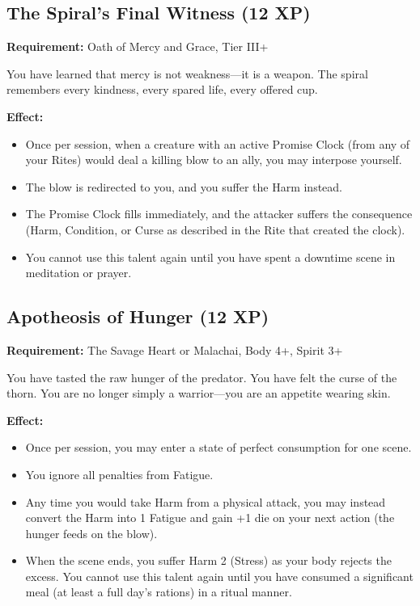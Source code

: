 \subsection{The Spiral's Final Witness (12 XP)}

\textbf{Requirement:} Oath of Mercy and Grace, Tier III+

You have learned that mercy is not weakness—it is a weapon. The spiral remembers every kindness, every spared life, every offered cup.

\textbf{Effect:}
\begin{itemize}
\item Once per session, when a creature with an active Promise Clock (from any of your Rites) would deal a killing blow to an ally, you may interpose yourself.
\item The blow is redirected to you, and you suffer the Harm instead.
\item The Promise Clock fills immediately, and the attacker suffers the consequence (Harm, Condition, or Curse as described in the Rite that created the clock).
\item You cannot use this talent again until you have spent a downtime scene in meditation or prayer.
\end{itemize}

\subsection{Apotheosis of Hunger (12 XP)}

\textbf{Requirement:} The Savage Heart or Malachai, Body 4+, Spirit 3+

You have tasted the raw hunger of the predator. You have felt the curse of the thorn. You are no longer simply a warrior—you are an appetite wearing skin.

\textbf{Effect:}
\begin{itemize}
\item Once per session, you may enter a state of perfect consumption for one scene.
\item You ignore all penalties from Fatigue.
\item Any time you would take Harm from a physical attack, you may instead convert the Harm into 1 Fatigue and gain +1 die on your next action (the hunger feeds on the blow).
\item When the scene ends, you suffer Harm 2 (Stress) as your body rejects the excess. You cannot use this talent again until you have consumed a significant meal (at least a full day's rations) in a ritual manner.
\end{itemize}

